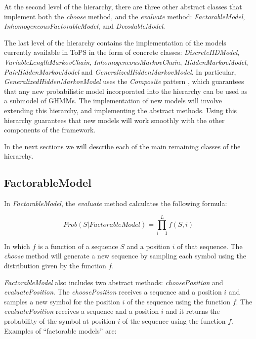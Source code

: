 

At the second level of the hierarchy, there are three other abstract classes that implement both the \textit{choose} method, and the \textit{evaluate} method: \textit{FactorableModel}, \textit{Inhomogeneous\-Factorable\-Model}, and \textit{DecodableModel}.

The last level of the hierarchy contains the implementation of the models currently available in ToPS in the form of concrete classes: \textit{DiscreteIIDModel}, \textit{Varia\-bleLengthMarkovChain}, \textit{InhomogeneousMarkovChain},  \textit{Hidden\-Markov\-Model}, \textit{PairHiddenMarkovModel} and  \textit{GeneralizedHidden\-Markov\-Model}.  In particular, \textit{Generalized\-Hidden\-Markov\-Model} uses the {\it Composite}  pattern \cite{Gamma1994}, which guarantees that any new probabilistic model incorporated into the hierarchy  can be  used as a submodel of GHMMs. The implementation of new models will involve extending this hierarchy, and implementing the abstract methods. Using this hierarchy guarantees that new models will work smoothly with the other components of the framework.

In the next  sections we will describe each of the main remaining classes of the hierarchy.



\subsection{FactorableModel}
\label{sec:factorable}


In \textit{FactorableModel}, the \textit{evaluate} method calculates the following formula:

\[ Prob (S|FactorableModel) = \prod_{i=1}^L f(S, i) \]

In which $f$ is a function  of a sequence $S$ and a position $i$ of that sequence. The \textit{choose} method will generate a new sequence by sampling each symbol using the distribution given by the function $f$.

\textit{FactorableModel} also includes two abstract methods: \textit{choose\-Position} and \textit{evaluatePosition}. The \textit{choosePosition} receives a sequence and a position $i$ and samples a new symbol for the position $i$ of the sequence using the function $f$. The \textit{evaluatePosition} receives a sequence and a position $i$ and it returns the probability of the symbol at position $i$ of the sequence using the function $f$. Examples of ``factorable models'' are:

